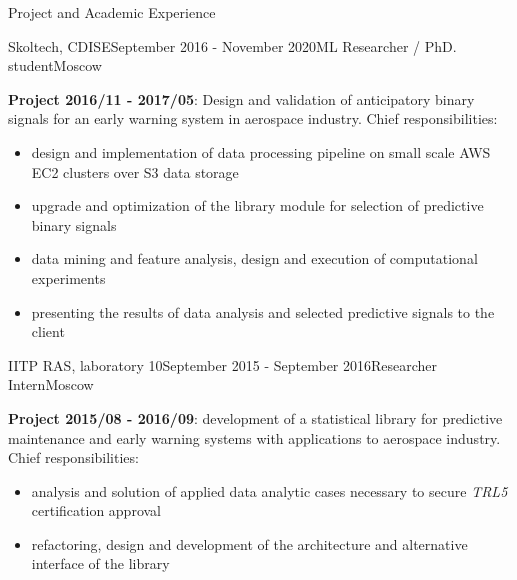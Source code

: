 \documentclass{resume} %
\begin{document}
\begin{rSection}{Project and Academic Experience}
\begin{rSubsection}{Skoltech, CDISE}{September 2016 - November 2020}{ML Researcher / PhD. student}{Moscow}
    \medskip
    \item \textbf{Project 2016/11 - 2017/05}: 
    Design and validation of anticipatory binary signals for an early warning system
    in aerospace industry.
    Chief responsibilities: \begin{itemize}
        \item design and implementation of data processing pipeline on small scale
        AWS EC2 clusters over S3 data storage
        
        \item upgrade and optimization of the library module for selection of
        predictive binary signals
        
        \item data mining and feature analysis, design and execution of computational
        experiments
        
        \item presenting the results of data analysis and selected predictive signals
        to the client
    \end{itemize}


\end{rSubsection}

\bigskip
\begin{rSubsection}{IITP RAS, laboratory 10}{September 2015 - September 2016}{Researcher Intern}{Moscow}
    \item \textbf{Project 2015/08 - 2016/09}: development of a statistical library
    for predictive maintenance and early warning systems with applications to
    aerospace industry.
    Chief responsibilities: \begin{itemize}
        \item analysis and solution of applied data analytic cases necessary to
        secure \textit{TRL5} certification approval

        \item refactoring, design and development of the architecture and alternative
        interface of the library


\end{itemize}
\end{rSubsection}
\end{rSection}
\end{document}
